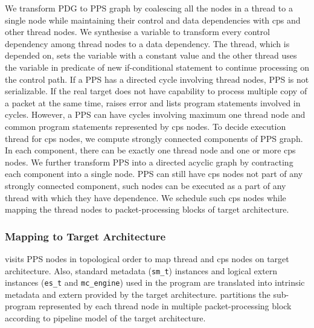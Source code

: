 \documentclass[letterpaper,twocolumn,10pt]{article}
\begin{document}


We transform PDG to PPS graph by coalescing all the nodes in a thread to a single node while maintaining their control and data dependencies with cps and other thread nodes.
We synthesise a variable to transform every control dependency among thread nodes to a data dependency.
The thread, which is depended on, sets the variable with a constant value and the other thread uses the variable in predicate of new if-conditional statement to continue processing on the control path.
If a PPS has a directed cycle involving thread nodes, PPS is not serializable.
If the real target does not have capability to process multiple copy of a packet at the same time, 
\ucomp raises error and lists program statements involved in cycles.
However, a PPS can have cycles involving maximum one thread node and common program statements represented by cps nodes.
To decide execution thread for cps nodes, we compute strongly connected components of PPS graph.
In each component, there can be exactly one thread node and one or more cps nodes.
We further transform PPS into a directed acyclic graph by contracting each component into a single node.
PPS can still have cps nodes not part of any strongly connected component, such nodes can be executed as a part of any thread with which they have dependence.
We schedule such cps nodes while mapping the thread nodes to packet-processing blocks of target architecture.






\subsubsection{Mapping to Target Architecture}
\ucomp visits PPS nodes in topological order to map thread and cps nodes on target architecture.
Also, standard metadata (\texttt{sm\_t}) instances and logical extern instances (\texttt{es\_t} and \texttt{mc\_engine}) used in the program are translated into intrinsic metadata and extern provided by the target architecture.
\ucomp partitions the sub-program represented by each thread node in multiple packet-processing block according to pipeline model of the target architecture.
\end{document}
